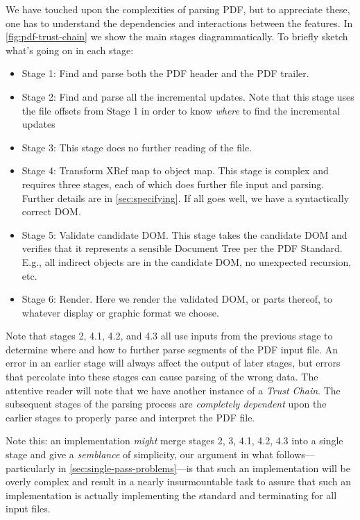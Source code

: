 We have touched upon the complexities of parsing
PDF, but to appreciate these, one has to understand the
dependencies and interactions between the features.
In \cref{fig:pdf-trust-chain} we show the main stages diagrammatically.
To briefly sketch what's going on in each stage:
\begin{itemize}
\item Stage 1: Find and parse both the PDF header and the PDF trailer.
\item Stage 2: Find and parse all the incremental updates.  Note that this stage
  uses the file offsets from Stage 1 in order to know \emph{where} to find the
  incremental updates
\item Stage 3: This stage does no further reading of the file.
\item Stage 4: Transform XRef map to object map. This stage is complex and
  requires three stages, each of which does further file input and parsing.
  Further details are in \cref{sec:specifying}.
  If all goes well, we have a syntactically correct DOM.
\item Stage 5: Validate candidate DOM.  This stage takes the candidate DOM and
  verifies that it represents a sensible Document Tree per the PDF Standard.
  E.g., all indirect objects are in the candidate DOM, no unexpected recursion,
  etc.
\item Stage 6: Render.  Here we render the validated DOM, or parts thereof, to
  whatever display or graphic format we choose.
\end{itemize}

Note that stages 2, 4.1, 4.2, and 4.3
all use inputs from the previous stage to determine where and
how to further parse segments of the PDF input file.
An error in an earlier stage will always affect the output of later stages,
but errors that percolate into these stages can cause parsing of the wrong data.
%
The attentive reader will note that we have another instance of a \emph{Trust
Chain}.  The subsequent stages of the parsing process are \emph{completely
dependent} upon the earlier stages to properly parse and interpret the PDF
file.

Note this: an implementation \emph{might} merge stages 2, 3, 4.1, 4.2, 4.3 into
a single stage and give a \emph{semblance} of simplicity, our argument in what
follows---particularly in \cref{sec:single-pass-problems}---is that such an
implementation will be overly complex and result in a nearly insurmountable task
to assure that such an implementation is actually implementing the standard
and terminating for all input files.

